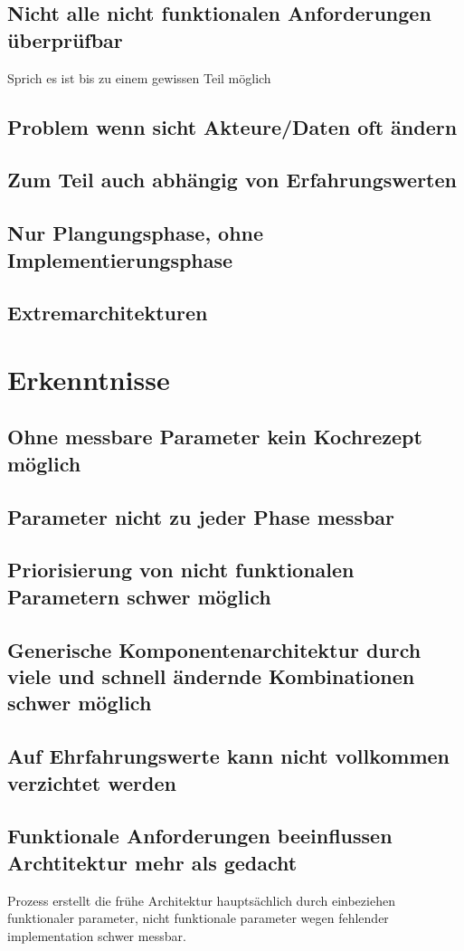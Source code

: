 \documentclass[Master,MSE,german]{twbook}
\begin{document}
\subsection{Nicht alle nicht funktionalen Anforderungen überprüfbar}
Sprich es ist bis zu einem gewissen Teil möglich
\subsection{Problem wenn sicht Akteure/Daten oft ändern}
\subsection{Zum Teil auch abhängig von Erfahrungswerten}
\subsection{Nur Plangungsphase, ohne Implementierungsphase}
\subsection{Extremarchitekturen}

\section{Erkenntnisse}
\subsection{Ohne messbare Parameter kein Kochrezept möglich}
\subsection{Parameter nicht zu jeder Phase messbar}
\subsection{Priorisierung von nicht funktionalen Parametern schwer möglich}
\subsection{Generische Komponentenarchitektur durch viele und schnell ändernde Kombinationen schwer möglich}
\subsection{Auf Ehrfahrungswerte kann nicht vollkommen verzichtet werden}
\subsection{Funktionale Anforderungen beeinflussen Archtitektur mehr als gedacht}
Prozess erstellt die frühe Architektur hauptsächlich durch einbeziehen funktionaler parameter, nicht funktionale parameter wegen fehlender implementation schwer messbar.
\end{document}
